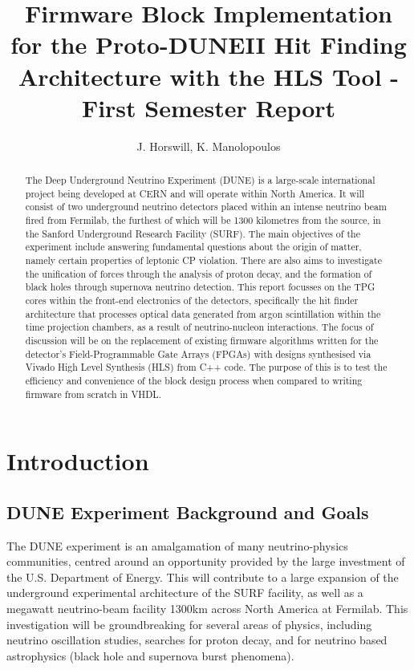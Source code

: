 \documentclass[10pt]{article}
\author{J. Horswill, K. Manolopoulos}
\title{Firmware Block Implementation for the Proto-DUNEII Hit Finding Architecture with the HLS Tool - First Semester Report}
\begin{document}
\maketitle

\begin{abstract}
	The Deep Underground Neutrino Experiment (DUNE) is a large-scale international project being developed at CERN and will operate within North America. It will consist of two underground neutrino detectors placed within an intense neutrino beam fired from Fermilab, the furthest of which will be 1300 kilometres from the source, in the Sanford Underground Research Facility (SURF). The main objectives of the experiment include answering fundamental questions about the origin of matter, namely certain properties of leptonic CP violation. There are also aims to investigate the unification of forces through the analysis of proton decay, and the formation of black holes through supernova neutrino detection\cite{deep_underground_neutrino_experiment_2020}. This report focusses on the TPG cores within the front-end electronics of the detectors, specifically the hit finder architecture that processes optical data generated from argon scintillation within the time projection chambers, as a result of neutrino-nucleon interactions. The focus of  discussion will be on the replacement of existing firmware algorithms written for the detector's Field-Programmable Gate Arrays (FPGAs) with designs synthesised via Vivado High Level Synthesis (HLS) from C++ code. The purpose of this is to test the efficiency and convenience of the block design process when compared to writing firmware from scratch in VHDL.
\end{abstract}

\newpage
\tableofcontents

\newpage

\section{Introduction}

\subsection{DUNE Experiment Background and Goals}
The DUNE experiment is an amalgamation of many neutrino-physics communities, centred around an opportunity provided by the large investment of the U.S. Department of Energy. This will contribute to a large expansion of the underground experimental architecture of the SURF facility, as well as a megawatt neutrino-beam facility 1300km across North America at Fermilab. This investigation will be groundbreaking for several areas of physics, including neutrino oscillation studies, searches for proton decay, and for neutrino based astrophysics (black hole and supernova burst phenomena).
\end{document}
